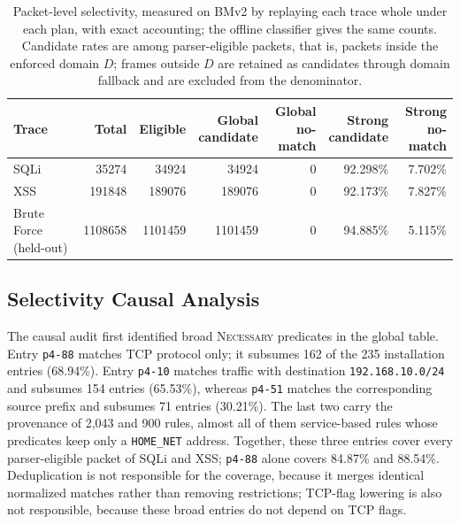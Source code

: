 \documentclass{article}
\begin{document}
\begin{table}[t]
\centering
\footnotesize
\setlength{\tabcolsep}{3pt}
\caption{Packet-level selectivity, measured on BMv2 by replaying each trace
whole under each plan, with exact accounting; the offline classifier gives
the same counts. Candidate rates are among parser-eligible packets, that is,
packets inside the enforced domain $D$; frames outside $D$ are retained as
candidates through domain fallback and are excluded from the denominator.}
\label{tab:packet-selectivity}
\begin{tabular}{lrrrrrr}
\toprule
Trace & Total & Eligible & \shortstack{Global\\candidate} & \shortstack{Global\\no-match} & \shortstack{Strong\\candidate} & \shortstack{Strong\\no-match} \\
\midrule
SQLi & 35274 & 34924 & 34924 & 0 & 92.298\% & 7.702\% \\
XSS & 191848 & 189076 & 189076 & 0 & 92.173\% & 7.827\% \\
Brute Force (held-out) & 1108658 & 1101459 & 1101459 & 0 & 94.885\% & 5.115\% \\
\bottomrule
\end{tabular}
\end{table}

\subsection{Selectivity Causal Analysis}
\label{sec:selectivity-causal}
The causal audit first identified broad \textsc{Necessary} predicates in the
global table. Entry \texttt{p4-88} matches TCP protocol only; it subsumes 162
of the 235 installation entries (68.94\%). Entry \texttt{p4-10} matches
traffic with destination \texttt{192.168.10.0/24} and subsumes 154 entries
(65.53\%), whereas \texttt{p4-51} matches the corresponding source prefix
and subsumes 71 entries (30.21\%). The last two carry the provenance of
2,043 and 900 rules, almost all of them service-based rules whose predicates
keep only a \texttt{HOME\_NET} address. Together, these three entries cover
every parser-eligible packet of SQLi and XSS; \texttt{p4-88} alone covers
84.87\% and 88.54\%. Deduplication is not responsible for the coverage,
because it merges identical normalized matches rather than removing
restrictions; TCP-flag lowering is also not responsible, because these broad
entries do not depend on TCP flags.
\end{document}
